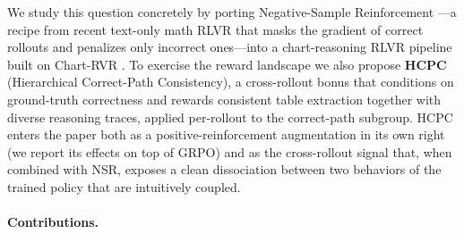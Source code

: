 \documentclass[11pt]{article}
\begin{document}
We study this question concretely by porting Negative-Sample
Reinforcement \citep[NSR;][]{zhu2025nsr}---a recipe from recent
text-only math RLVR that masks the gradient of correct rollouts and
penalizes only incorrect ones---into a chart-reasoning RLVR pipeline
built on Chart-RVR \citep{chartrvr2025}. To exercise the reward
landscape we also propose \textbf{HCPC} (Hierarchical Correct-Path
Consistency), a cross-rollout bonus that conditions on ground-truth
correctness and rewards consistent table extraction together with
diverse reasoning traces, applied per-rollout to the correct-path
subgroup. HCPC enters the paper both as a positive-reinforcement
augmentation in its own right (we report its effects on top of GRPO)
and as the cross-rollout signal that, when combined with NSR,
exposes a clean dissociation between two behaviors of the trained
policy that are intuitively coupled.

\paragraph{Contributions.}
\end{document}

